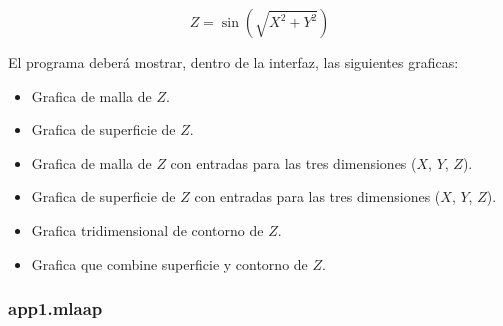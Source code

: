 \documentclass{article}
\begin{document}
	\begin{equation*}
		Z = \sin (\sqrt{X^2 + Y^2})
	\end{equation*}
	
	El programa deberá mostrar, dentro de la interfaz, las siguientes graficas:
	
	\begin{itemize}
		\item Grafica de malla de $Z$.
		\item Grafica de superficie de $Z$.
		\item Grafica de malla de $Z$ con entradas para las tres dimensiones ($X$, $Y$, $Z$).
		\item Grafica de superficie de $Z$ con entradas para las tres dimensiones ($X$, $Y$, $Z$).
		\item Grafica tridimensional de contorno de $Z$.
		\item Grafica que combine superficie y contorno de $Z$.
	\end{itemize}
	
	\newpage
	
	\subsubsection{app1.mlaap}
	
\end{document}
